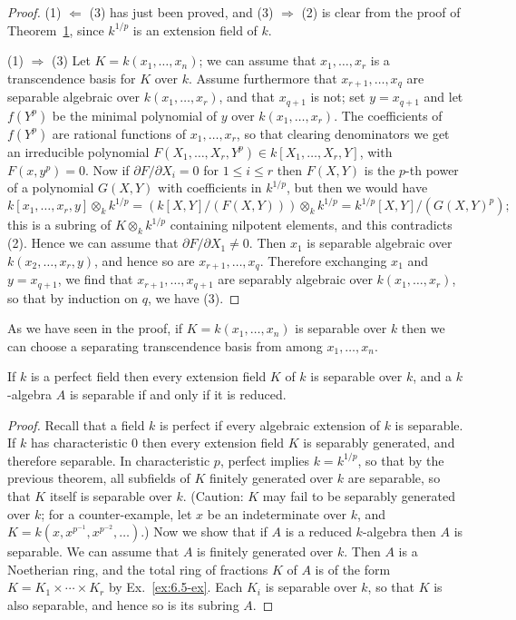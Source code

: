 \begin{proof}
(1) $\Leftarrow$ (3) has just been proved, and (3) $\Rightarrow$ (2) is clear from the
proof of Theorem~\hyperref[thm:26.1]{1}, since $k^{1/p}$ is an extension field of $k$.

(1) $\Rightarrow$ (3) Let $K = k(x_1, \ldots, x_n)$; we can assume that $x_1, \ldots, x_r$ is a
transcendence basis for $K$ over $k$. Assume furthermore that $x_{r+1}, \ldots, x_q$ are
separable algebraic over $k(x_1, \ldots, x_r)$, and that $x_{q+1}$ is not; set $y = x_{q+1}$
and let $f(Y^p)$ be the minimal polynomial of $y$ over $k(x_1, \ldots, x_r)$. The
coefficients of $f(Y^p)$ are rational functions of $x_1, \ldots, x_r$, so that clearing
denominators we get an irreducible polynomial
$F(X_1, \ldots, X_r, Y^p) \in k[X_1, \ldots, X_r, Y]$, with $F(x, y^p) = 0$. Now if
$\partial F/\partial X_i = 0$ for $1 \le i \le r$ then $F(X, Y)$ is the $p$-th power of a polynomial
$G(X, Y)$ with coefficients in $k^{1/p}$, but then we would have
\[
  k[x_1, \ldots, x_r, y] \otimes_k k^{1/p} = (k[X, Y]/(F(X, Y))) \otimes_k k^{1/p}
      = k^{1/p}[X, Y]/(G(X, Y)^p);
\]
this is a subring of $K \otimes_k k^{1/p}$ containing nilpotent elements, and this
contradicts (2). Hence we can assume that $\partial F/\partial X_1 \ne 0$. Then $x_1$ is
separable algebraic over $k(x_2, \ldots, x_r, y)$, and hence so are $x_{r+1}, \ldots, x_q$.
Therefore exchanging $x_1$ and $y = x_{q+1}$, we find that $x_{r+1}, \ldots, x_{q+1}$ are
separably algebraic over $k(x_1, \ldots, x_r)$, so that by induction on $q$, we have
(3).
\end{proof}

\begin{remark}
As we have seen in the proof, if $K = k(x_1, \ldots, x_n)$ is separable over $k$ then we
can choose a separating transcendence basis from among $x_1, \ldots, x_n$.
\end{remark}

\begin{theorem}\label{thm:26.3}
If $k$ is a perfect field then every extension field $K$ of $k$ is separable over
$k$, and a $k$-algebra $A$ is separable if and only if it is reduced.
\end{theorem}

\begin{proof}
Recall that a field $k$ is perfect if every algebraic extension of $k$ is separable.
If $k$ has characteristic $0$ then every extension field $K$ is separably generated,
and therefore separable. In characteristic $p$, perfect implies $k = k^{1/p}$, so that
by the previous theorem, all subfields of $K$ finitely generated over $k$ are
separable, so that $K$ itself is separable over $k$. (Caution: $K$ may fail to be
separably generated over $k$; for a counter-example, let $x$ be an indeterminate
over $k$, and $K = k(x, x^{p^{-1}}, x^{p^{-2}}, \ldots)$.) Now we show that if $A$ is a
reduced $k$-algebra then $A$ is separable. We can assume that $A$ is finitely
generated over $k$. Then $A$ is a Noetherian ring, and the total ring of fractions
$K$ of $A$ is of the form $K = K_1 \times \cdots \times K_r$ by Ex.~\ref{ex:6.5-ex}. Each $K_i$ is
separable over $k$, so that $K$ is also separable, and hence so is its subring $A$.
\end{proof}

